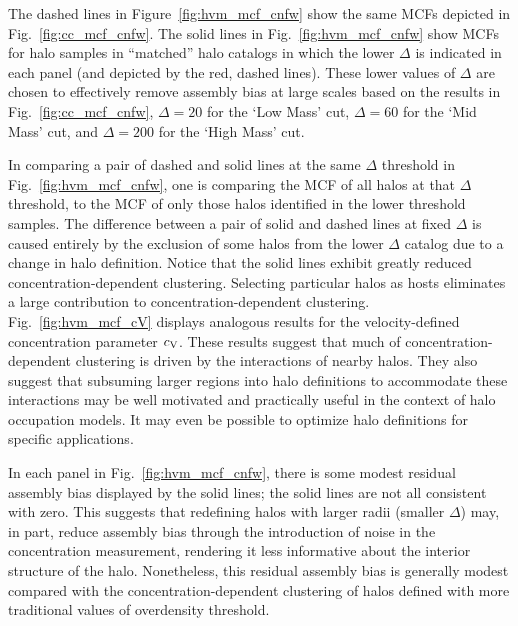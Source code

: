 \documentclass[usenatbib,fleqn]{mnras}
\begin{document}
The dashed lines in Figure~\ref{fig:hvm_mcf_cnfw} show the same MCFs depicted 
in Fig.~\ref{fig:cc_mcf_cnfw}. The solid lines in Fig.~\ref{fig:hvm_mcf_cnfw} show MCFs for halo samples in ``matched'' halo catalogs in which the lower $\Delta$ is indicated in each panel (and depicted by the red, dashed lines). These lower 
values of $\Delta$ are chosen to effectively remove assembly bias at large scales based on the results in Fig.~\ref{fig:cc_mcf_cnfw}, 
$\Delta=20$ for the `Low Mass' cut, 
$\Delta=60$ for the `Mid Mass' cut, 
and $\Delta=200$ for the `High Mass' cut. 

In comparing a pair of dashed and solid lines at the same $\Delta$ threshold in Fig.~\ref{fig:hvm_mcf_cnfw}, one is comparing the MCF of all halos at that $\Delta$ threshold, to the MCF of only those halos identified in the lower threshold samples. The difference between a pair of solid and dashed lines at fixed $\Delta$ is caused entirely by the exclusion of some halos from the lower $\Delta$ catalog due to a change in halo definition. Notice that the solid lines exhibit greatly reduced concentration-dependent clustering. Selecting particular halos as hosts eliminates a large contribution to concentration-dependent clustering. Fig.~\ref{fig:hvm_mcf_cV} displays analogous results for the velocity-defined concentration parameter $c_{\rm V}$. These results suggest that much of concentration-dependent clustering is driven by the interactions of nearby halos. They also suggest that subsuming larger regions into halo definitions to accommodate these interactions may be well motivated and practically useful in the context of halo occupation models. It may even be possible to optimize halo definitions for specific applications. 

In each panel in Fig.~\ref{fig:hvm_mcf_cnfw}, there is some modest residual assembly bias displayed by the solid lines; the solid lines are not all consistent with zero. This suggests that redefining halos with larger radii (smaller $\Delta$) may, in part, reduce assembly bias through the introduction of noise in the concentration measurement, rendering it less informative about the interior structure of the halo. Nonetheless, this residual assembly bias is generally modest compared with the concentration-dependent clustering of halos defined with more traditional values of overdensity threshold.
\end{document}
